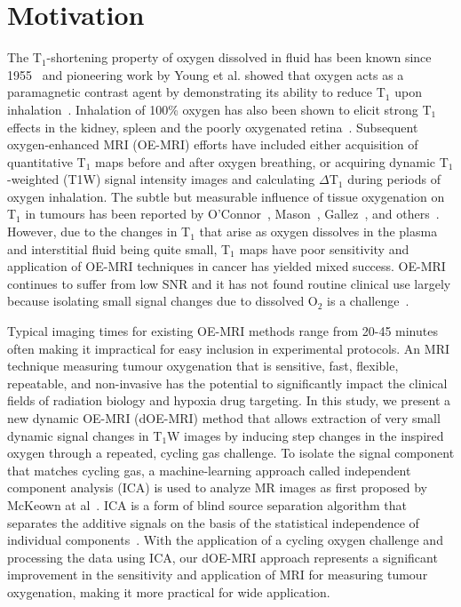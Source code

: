\section{Motivation}

The T$_1$-shortening property of oxygen dissolved in fluid has been known since 1955~\cite{Chiarotti:1955kf} and pioneering work by Young et al. showed that oxygen acts as a paramagnetic contrast agent by demonstrating its ability to reduce T$_1$ upon inhalation~\cite{Young:1981vf}. 
Inhalation of 100\% oxygen has also been shown to elicit strong T$_1$ effects in the kidney\cite{Jones:2002dh}, spleen\cite{Tadamura:1997vc} and the poorly oxygenated retina~\cite{Berkowitz:2001uz}. 
Subsequent oxygen-enhanced MRI (OE-MRI) efforts have included either acquisition of quantitative T$_1$ maps before and after oxygen breathing, or acquiring dynamic T$_1$-weighted (T1W) signal intensity images and calculating $\Delta$T$_1$ during periods of oxygen inhalation.
The subtle but measurable influence of tissue oxygenation on T$_1$ in tumours has been reported by O'Connor~\cite{OConnor:2016ee,OConnor:2009ku,OConnor:2009bp,Little:2018iu}, Mason~\cite{Zhao:2015ez,White:2016fz,Hallac:2014cb}, Gallez~\cite{Jordan:2012do}, and others~\cite{Tadamura:1997vc,McGrath:2008kx,Kershaw:2010ha,Linnik:2013hf}. 
However, due to the changes in T$_1$ that arise as oxygen dissolves in the plasma and interstitial fluid being quite small, T$_1$ maps have poor sensitivity and application of OE-MRI techniques in cancer has yielded mixed success.
OE-MRI continues to suffer from low \acs{SNR} and it has not found routine clinical use largely because isolating small signal changes due to dissolved O$_2$ is a challenge~\cite{OConnor:2016ee, Zhao:2015ez}.

Typical imaging times for existing OE-MRI methods range from 20-45 minutes often making it impractical for easy inclusion in experimental protocols. 
An MRI technique measuring tumour oxygenation that is sensitive, fast, flexible, repeatable, and non-invasive has the potential to significantly impact the clinical fields of radiation biology and hypoxia drug targeting.
In this study, we present a new dynamic OE-MRI (dOE-MRI) method that allows extraction of very small dynamic signal changes in T$_1$W images by inducing step changes in the inspired oxygen through a repeated, cycling gas challenge.
To isolate the signal component that matches cycling gas, a machine-learning approach called independent component analysis (\acs{ICA}) is used to analyze MR images as first proposed by McKeown at al~\cite{McKeown:1998wo}.
\acs{ICA} is a form of blind source separation algorithm that separates the additive signals on the basis of the statistical independence of individual components~\cite{Hyvarinen:2000vk}.
With the application of a cycling oxygen challenge and processing the data using \acs{ICA}, our \acs{dOE-MRI} approach represents a significant improvement in the sensitivity and application of MRI for measuring tumour oxygenation, making it more practical for wide application.
